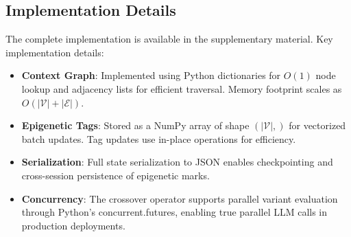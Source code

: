 \subsection{Implementation Details}

The complete \EpiContext{} implementation is available in the supplementary material. Key implementation details:

\begin{itemize}
    \item \textbf{Context Graph}: Implemented using Python dictionaries for $O(1)$ node lookup and adjacency lists for efficient traversal. Memory footprint scales as $O(|\mathcal{V}| + |\mathcal{E}|)$.
    \item \textbf{Epigenetic Tags}: Stored as a NumPy array of shape $(|\mathcal{V}|,)$ for vectorized batch updates. Tag updates use in-place operations for efficiency.
    \item \textbf{Serialization}: Full state serialization to JSON enables checkpointing and cross-session persistence of epigenetic marks.
    \item \textbf{Concurrency}: The crossover operator supports parallel variant evaluation through Python's concurrent.futures, enabling true parallel LLM calls in production deployments.
\end{itemize}
